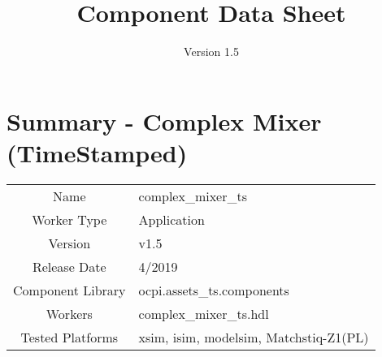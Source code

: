 \iffalse
This file is protected by Copyright. Please refer to the COPYRIGHT file
distributed with this source distribution.

This file is part of OpenCPI <http://www.opencpi.org>

OpenCPI is free software: you can redistribute it and/or modify it under the
terms of the GNU Lesser General Public License as published by the Free Software
Foundation, either version 3 of the License, or (at your option) any later
version.

OpenCPI is distributed in the hope that it will be useful, but WITHOUT ANY
WARRANTY; without even the implied warranty of MERCHANTABILITY or FITNESS FOR A
PARTICULAR PURPOSE. See the GNU Lesser General Public License for more details.

You should have received a copy of the GNU Lesser General Public License along
with this program. If not, see <http://www.gnu.org/licenses/>.
\fi

\def\importpath{../../../imports/ocpi.assets/components/dsp_comps/complex_mixer.test/doc/}

\def\docTitle{Component Data Sheet}
\def\docVersion{1.5}
\date{Version \docVersion} %
\title{\docTitle}
\lhead{\small{\docTitle}}

\def\comp{complex\_mixer\_ts}
\edef\ecomp{complex_mixer_ts}
\def\Comp{Complex Mixer (TimeStamped)}
\graphicspath{ {figures/} }



\section*{Summary - \Comp}
\begin{tabular}{|c|M{13.5cm}|}
	\hline
	                  & \\
	\hline
	Name              & \comp \\
	\hline
	Worker Type       & Application \\
	\hline
	Version           & v\docVersion \\
	\hline
	Release Date      & 4/2019 \\
	\hline
	Component Library & ocpi.assets\_ts.components \\
	\hline
	Workers           & \comp.hdl \\
	\hline
	Tested Platforms  & xsim, isim, modelsim, Matchstiq-Z1(PL) \\
	\hline
\end{tabular}

